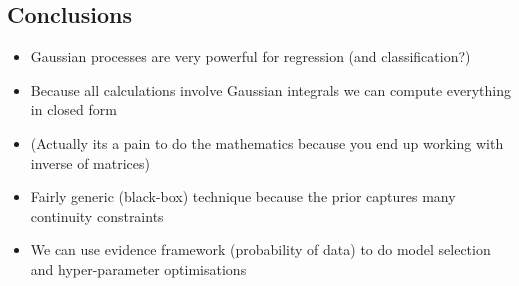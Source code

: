 \begin{slide}
\section{Conclusions}

\begin{PauseHighLight}
  \begin{itemize}
  \item Gaussian processes are very powerful for regression (and
    classification?)\pause
  \item Because all calculations involve Gaussian integrals we can
    compute everything in closed form\pause
  \item (Actually its a pain to do the mathematics because you end up
    working with inverse of matrices)\pause
  \item Fairly generic (black-box) technique because the prior captures
    many continuity constraints\pause
  \item We can use evidence framework (probability of data) to do model
    selection and hyper-parameter optimisations\pause
  \end{itemize}
\end{PauseHighLight}

\end{slide}

